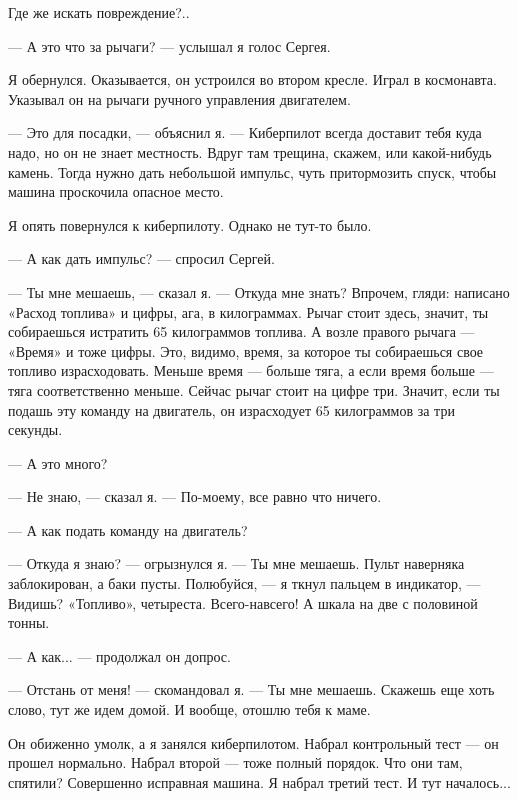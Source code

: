\documentclass[11pt,a4paper,oneside]{article}
\begin{document}
Где же искать повреждение?..

— А это что за рычаги? — услышал я голос Сергея.

Я обернулся. Оказывается, он устроился во втором кресле. Играл в космонавта. Указывал он на рычаги ручного управления двигателем.

— Это для посадки, — объяснил я. — Киберпилот всегда доставит тебя куда надо, но он не знает местность. Вдруг там трещина, скажем, или какой-нибудь камень. Тогда нужно дать небольшой импульс, чуть притормозить спуск, чтобы машина проскочила опасное место.

Я опять повернулся к киберпилоту. Однако не тут-то было.

— А как дать импульс? — спросил Сергей.

— Ты мне мешаешь, — сказал я. — Откуда мне знать? Впрочем, гляди: написано «Расход топлива» и цифры, ага, в килограммах. Рычаг стоит здесь, значит, ты собираешься истратить 65 килограммов топлива. А возле правого рычага — «Время» и тоже цифры. Это, видимо, время, за которое ты собираешься свое топливо израсходовать. Меньше время — больше тяга, а если время больше — тяга соответственно меньше. Сейчас рычаг стоит на цифре три. Значит, если ты подашь эту команду на двигатель, он израсходует 65 килограммов за три секунды.

— А это много?

— Не знаю, — сказал я. — По-моему, все равно что ничего.

— А как подать команду на двигатель?

— Откуда я знаю? — огрызнулся я. — Ты мне мешаешь. Пульт наверняка заблокирован, а баки пусты. Полюбуйся, — я ткнул пальцем в индикатор, — Видишь? «Топливо», четыреста. Всего-навсего! А шкала на две с половиной тонны.

— А как... — продолжал он допрос.

— Отстань от меня! — скомандовал я. — Ты мне мешаешь. Скажешь еще хоть слово, тут же идем домой. И вообще, отошлю тебя к маме.

Он обиженно умолк, а я занялся киберпилотом. Набрал контрольный тест — он прошел нормально. Набрал второй — тоже полный порядок. Что они там, спятили? Совершенно исправная машина. Я набрал третий тест. И тут началось...
\end{document}

